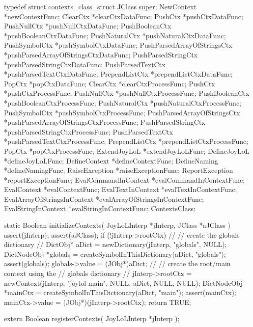 \startTestSuite[registerContexts]

\startCHeader
typedef struct contexts_class_struct {
  JClass      super;
  NewContext     *newContextFunc;
  ClearCtx       *clearCtxDataFunc;
  PushCtx        *pushCtxDataFunc; 
  PushNullCtx    *pushNullCtxDataFunc;
  PushBooleanCtx *pushBooleanCtxDataFunc;
  PushNaturalCtx *pushNaturalCtxDataFunc;
  PushSymbolCtx  *pushSymbolCtxDataFunc;
  PushParsedArrayOfStringsCtx 
    *pushParsedArrayOfStringsCtxDataFunc;
  PushParsedStringCtx
    *pushParsedStringCtxDataFunc;
  PushParsedTextCtx
    *pushParsedTextCtxDataFunc;
  PrependListCtx *prependListCtxDataFunc;
  PopCtx         *popCtxDataFunc;
  ClearCtx       *clearCtxProcessFunc;
  PushCtx        *pushCtxProcessFunc;
  PushNullCtx    *pushNullCtxProcessFunc;
  PushBooleanCtx *pushBooleanCtxProcessFunc;
  PushNaturalCtx *pushNaturalCtxProcessFunc;
  PushSymbolCtx  *pushSymbolCtxProcessFunc;
  PushParsedArrayOfStringsCtx
    *pushParsedArrayOfStringsCtxProcessFunc;
  PushParsedStringCtx
    *pushParsedStringCtxProcessFunc;
  PushParsedTextCtx
    *pushParsedTextCtxProcessFunc;
  PrependListCtx *prependListCtxProcessFunc;
  PopCtx         *popCtxProcessFunc;
  ExtendJoyLoL   *extendJoyLoLFunc;
  DefineJoyLoL   *defineJoyLoLFunc;
  DefineContext  *defineContextFunc;
  DefineNaming   *defineNamingFunc;
  RaiseException *raiseExceptionFunc;
  ReportException
    *reportExceptionFunc;
  EvalCommandInContext
    *evalCommandInContextFunc;
  EvalContext    *evalContextFunc;
  EvalTextInContext
    *evalTextInContextFunc;
  EvalArrayOfStringsInContext
    *evalArrayOfStringsInContextFunc;
  EvalStringInContext
    *evalStringInContextFunc;
} ContextsClass;
\stopCHeader

\startCCode
static Boolean initializeContexts(
  JoyLoLInterp *jInterp,
  JClass   *aJClass
) {
  assert(jInterp);
  assert(aJClass);
  if (!jInterp->rootCtx) {
    //
    // create the globals dictionary
    //
    DictObj* aDict = newDictionary(jInterp, "globals", NULL);
    DictNodeObj *globals = 
      createSymbolInThisDictionary(aDict, "globals");
    assert(globals);
    globals->value = (JObj*)aDict;
    //
    // create the root/main context using the 
    // globals dictionary
    //
    jInterp->rootCtx =
      newContext(jInterp, "joylol-main", NULL, aDict, NULL, NULL);
    DictNodeObj *mainCtx = 
      createSymbolInThisDictionary(aDict, "main");
    assert(mainCtx);
    mainCtx->value = (JObj*)(jInterp->rootCtx);
  }
  return TRUE;
}
\stopCCode

\startCHeader
extern Boolean registerContexts(
  JoyLoLInterp *jInterp
);
\stopCHeader
{}

